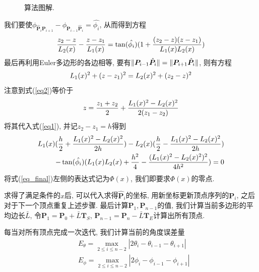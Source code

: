 \documentclass[utf8]{ctexart} %
\begin{document}
\begin{figure}[ht]
\begin{minipage}[b]{0.33\textwidth}
 \end{minipage}
	 	\caption{算法图解. }
	 \end{figure}
	 
	 
	  我们要使$\phi_{\hat{\boldsymbol{P}}_i\boldsymbol{P}_{i+1}}-\phi_{\boldsymbol{P}_{i-1}\hat{\boldsymbol{P}}_i}=\hat{\phi_i}$, 从而得到方程
	 \begin{equation}\label{eq1}
	 \frac{z_2-z}{\boldmath{L}_2(x)}-\frac{z-z_1}{\boldmath{L}_1(x)} = \tan(\hat{\phi_i})(1+\frac{(z_2-z)(z-z_1)}{\boldmath{L}_1(x)\boldmath{L}_2(x)})
	 \end{equation}
	 最后再利用Euler多边形的各边相等, 要有$\Arrowvert\boldsymbol{P}_{i-1}\hat{\boldsymbol{P}}_i\Arrowvert = \Arrowvert\boldsymbol{P}_{i+1}\hat{\boldsymbol{P}}_i\Arrowvert$, 则有方程
	 \begin{equation}\label{eq2}
	 \boldmath{L}_1(x)^2+(z-z_1)^2 =\boldmath{L}_2(x)^2+(z_2-z)^2
	 \end{equation}
	 注意到式(\ref{eq2})等价于
	 \begin{equation}
	 z = \frac{z_1+z_2}2+\frac{\boldmath{L}_1(x)^2-\boldmath{L}_2(x)^2}{2(z_1-z_2)}
	 \end{equation}
	 将其代入式(\ref{eq1}), 并记$z_2-z_1 = h$得到
	 \begin{equation}\label{eq_final}
	 \begin{aligned}
	 \boldmath{L}_1(x)(\frac h2+\frac{\boldmath{L}_1(x)^2-\boldmath{L}_2(x)^2}{2h})-\boldmath{L}_2(x)(\frac h2-\frac{\boldmath{L}_1(x)^2-\boldmath{L}_2(x)^2}{2h})\\
	 -\tan(\hat{\phi_i})(\boldmath{L}_1(x)\boldmath{L}_2(x)+\frac{h^2}4-\frac{(\boldmath{L}_1(x)^2-\boldmath{L}_2(x)^2)^2}{4h^2})=0
	 \end{aligned}
	 \end{equation}
	 将式(\ref{eq_final})左侧的表达式记为$\Phi(x)$, 我们即要求$\Phi(x)$的零点. \par 
	 求得了满足条件的$x$后, 可以代入求得$\hat{\boldsymbol{P}}_i$的坐标, 用新坐标更新顶点序列的$\boldsymbol{P}_i$, 之后对于下一个顶点重复上述步骤. 最后计算$\boldsymbol{P}_1, \boldsymbol{P}_{n-1}$的值, 我们计算当前多边形的平均边长$\bar{L}$, 令$\boldsymbol{P}_1 = \boldsymbol{P}_0+\bar{L}\boldsymbol{T}_S$, $\boldsymbol{P}_{n-1} = \boldsymbol{P}_n-\bar{L}\boldsymbol{T}_E$计算出所有顶点. \par 
	 每当对所有顶点完成一次迭代, 我们计算当前的角度误差量
	 \begin{equation}\label{error}
	 \begin{aligned}
	 &E_{\theta} = \max_{2\leq i\leq n-2}|2\theta_i-\theta_{i-1}-\theta_{i+1}|\\
	 &E_{\phi} = \max_{2\leq i\leq n-2}|2\phi_i-\phi_{i-1}-\phi_{i+1}|
	 \end{aligned}
	 \end{equation}
\end{document}
